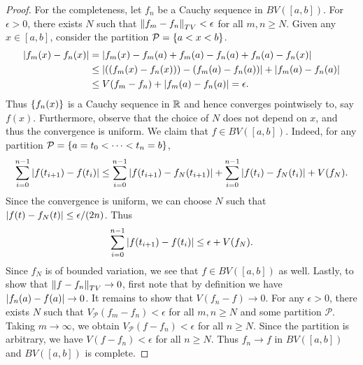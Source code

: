 \begin{proof}
    For the completeness, let $f_n$ be a Cauchy sequence in 
    $BV([a,b])$. For $\epsilon>0$, there exists $N$ such that 
    $\left\lVert {f_m-f_n} \right\rVert_{TV}<\epsilon$ for all $m,n\geq N$. Given 
    any $x\in[a,b]$, consider the partition $\mathcal{P} 
    = \left\{ {a<x<b} \right\}$. 
    \begin{equation*}
        \begin{split}
            \abs{f_m(x)-f_n(x)} 
            &= \abs{f_m(x)-f_m(a)+f_m(a)-f_n(a)+f_n(a)-f_n(x)} \\ 
            &\leq \abs{(\pth{f_m(x)-f_n(x)}) - (f_m(a) - f_n(a))} + \abs{f_m(a)-f_n(a)} \\
            &\leq V(f_m-f_n) + \abs{f_m(a)-f_n(a)} = \epsilon.
        \end{split}
    \end{equation*}
    Thus $\left\{ {f_n(x)} \right\}$ is a Cauchy sequence in $\mathbb{R}$ and hence 
    converges pointwisely to, say $f(x)$. Furthermore, observe that 
    the choice of $N$ does not depend on $x$, and thus the convergence 
    is uniform. We claim that $f\in BV([a,b])$. Indeed, for any 
    partition $\mathcal{P} = \left\{ {a = t_0<\cdots<t_n = b} \right\}$, 
    \begin{equation*}
        \sum_{i=0}^{n-1} \left\lvert {f(t_{i+1})-f(t_i)} \right\rvert 
        \leq \sum_{i=0}^{n-1} \left\lvert {f(t_{i+1})-f_N(t_{i+1})} \right\rvert + \sum_{i=0}^{n-1} \left\lvert {f(t_i)-f_N(t_i)} \right\rvert + V(f_N).
    \end{equation*}
    Since the convergence is uniform, we can choose $N$ such that 
    $\left\lvert {f(t)-f_N(t)} \right\rvert\leq \epsilon/(2n)$. Thus
    \begin{equation*}
        \sum_{i=0}^{n-1} \left\lvert {f(t_{i+1})-f(t_i)} \right\rvert \leq \epsilon + V(f_N).
    \end{equation*}
    Since $f_N$ is of bounded variation, we see that $f\in BV([a,b])$ 
    as well. Lastly, to show that $\left\lVert {f-f_n} \right\rVert_{TV}\to 0$, 
    first note that by definition we have $\left\lvert {f_n(a)-f(a)} \right\rvert\to 0$. 
    It remains to show that $V(f_n-f)\to 0$. For any $\epsilon>0$, 
    there exists $N$ such that $V_{\mathcal{P}}(f_m-f_n)<\epsilon$ 
    for all $m,n\geq N$ and some partition $\mathcal{P}$. Taking 
    $m\to\infty$, we obtain $V_{\mathcal{P}}(f-f_n)<\epsilon$ for 
    all $n\geq N$. Since the partition is arbitrary, we have 
    $V(f-f_n)<\epsilon$ for all $n\geq N$. Thus $f_n\to f$ in 
    $BV([a,b])$ and $BV([a,b])$ is complete.
\end{proof}


